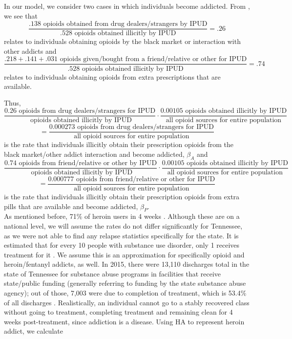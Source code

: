\documentclass[12pt]{article}
\begin{document}
In our model, we consider two cases in which individuals become addicted. From \cite{Han}, we see that \\
$$\frac{.138 \text{ opioids obtained from drug dealers/strangers by IPUD}}{.528 \text{ opioids obtained illicitly by IPUD}}=.26$$ 
relates to individuals obtaining opioids by the black market or interaction with other addicts and
$$\frac{.218+.141+.031 \text{ opioids given/bought from a friend/relative or other for IPUD}}{.528 \text{ opioids obtained illicitly by IPUD}}=.74$$ 
relates to individuals obtaining opioids from extra prescriptions that are available. 

Thus, 
$$\frac{0.26 \text{ opioids from drug dealers/strangers for IPUD}}{\text{ opioids obtained illicitly by IPUD}}\cdot \frac{0.00105 \text{ opioids obtained illicitly by IPUD}}{\text{all opioid sources for entire population}}$$
$$ =\frac{0.000273 \text{ opioids from drug dealers/strangers for IPUD}}{\text{all opioid sources for entire population}}$$
is the rate that individuals illicitly obtain their prescription opioids from the black market/other addict interaction and become addicted, $\beta_A$ and 
$$\frac{0.74 \text{ opioids from friend/relative or other by IPUD}}{\text{ opioids obtained illicitly by IPUD}}\cdot \frac{0.00105 \text{ opioids obtained illicitly by IPUD}}{\text{all opioid sources for entire population}}$$
$$ =\frac{0.000777 \text{ opioids from friend/relative or other for IPUD}}{\text{all opioid sources for entire population}}$$
is the rate that individuals illicitly obtain their prescription opioids from extra pills that are available and become addicted, $\beta_P.$ \\


As mentioned before, 71\% of heroin users in 4 weeks \cite{Smyth}. Although these are on a national level, we will assume the rates do not differ significantly for Tennessee, as we were not able to find any relapse statistics specifically for the state. 
 It is estimated that for every 10 people with substance use disorder, only 1 receives treatment for it \cite{SurgeonGeneral}. We assume this is an approximation for specifically opioid and heroin/fentanyl addicts, as well. In 2015, there were 13,110 discharges total in the state of Tennessee for substance abuse programs in facilities that receive state/public funding (generally referring to funding by the state substance abuse agency); out of those, 7,003 were due to completion of treatment, which is 53.4\% of all discharges \cite{TEDS2015_SAMSHA_discharges}. Realistically, an individual cannot go to a stably recovered class without going to treatment, completing treatment and remaining clean for 4 weeks post-treatment, since addiction is a disease. Using HA to represent heroin addict, we calculate
\end{document}
